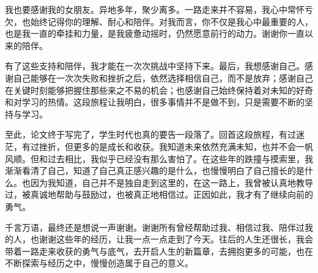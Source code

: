 \documentclass[type = master, class = professional]{whu-thesis}
\newif\ifthesisblindreview
\begin{document}
\begin{acknowledgements}
我也要感谢我的女朋友。异地多年，聚少离多。一路走来并不容易，我心中常怀亏欠，也始终记得你的理解、耐心和陪伴。对我而言，你不仅是我心中最重要的人，也是我一直的牵挂和力量，是我疲惫动摇时，仍然愿意前行的动力。谢谢你一直以来的陪伴。

有了这些支持和陪伴，我才能在一次次挑战中坚持下来。最后，我想感谢自己。感谢自己能够在一次次失败和挫折之后，依然选择相信自己，而不是放弃；感谢自己在关键时刻能够把握住那些来之不易的机会；也感谢自己始终保持着对未知的好奇和对学习的热情。这段旅程让我明白，很多事情并不是做不到，只是需要不断的坚持与学习。

至此，论文终于写完了，学生时代也真的要告一段落了。回首这段旅程，有过迷茫，有过挫折，但更多的是成长和收获。我知道未来依然充满未知，也并不会一帆风顺。但和过去相比，我似乎已经没有那么害怕了。在这些年的跌撞与摸索里，我渐渐看清了自己，知道了自己真正感兴趣的是什么，也慢慢明白了自己擅长的是什么。也因为我知道，自己并不是独自走到这里的，在这一路上，我曾被认真地教导过，被真诚地帮助与鼓励过，也被真正地相信过。正因如此，我才有了继续向前的勇气。

千言万语，最终还是想说一声谢谢。谢谢所有曾经帮助过我、相信过我、陪伴过我的人，也谢谢这些年的经历，让我一点一点走到了今天。往后的人生还很长，我会带着一路走来收获的勇气与底气，去开启人生的新篇章，去拥抱更多的可能，也在不断探索与经历之中，慢慢创造属于自己的意义。
\end{acknowledgements}
\fi

\appendix
\ifthesisblindreview\else

\fi
\ifthesisblindreview
\setcounter{chapter}{1}
\fi

\end{document}
